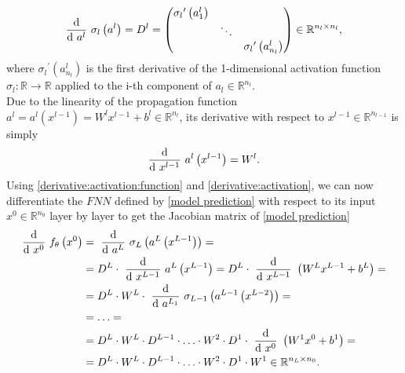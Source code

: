 \begin{equation}
    \label{derivative:activation:function}
    \frac{\textup{d}}{\textup{d} \ a^{l}} \ \sigma_{l} \left(a^l\right) = D^{l} = \begin{pmatrix} {\sigma_{l}}^{\prime} \left( a^{l}_1 \right) & & \\ & \ddots & \\ & & {\sigma_{l}}^{\prime} \left( a^{l}_{n_l} \right) \end{pmatrix} \in \mathbb{R}^{n_l \times n_l}, 
\end{equation}
where ${\sigma_{l}}^{\prime} \left( a^{l}_{n_l} \right)$ is the first derivative of the 1-dimensional activation function $\sigma_{l} \colon \mathbb{R} \to \mathbb{R}$ applied to the i-th component of $a_l \in \mathbb{R}^{n_l}$. \\
Due to the linearity of the propagation function $a^l = a^l\left(x^{l-1}\right) = W^{l} x^{l-1} + b^{l} \in \mathbb{R}^{n_l}$, its derivative with respect to $x^{l-1} \in \mathbb{R}^{n_{l-1}}$ is simply
\begin{equation}
    \label{derivative:activation}
    \frac{\textup{d}}{\textup{d} \ x^{l-1}} \ a^{l}\left(x^{l-1}\right) = W^l.
\end{equation}
Using \cref{derivative:activation:function} and \cref{derivative:activation}, we can now differentiate the $FNN$ defined by \cref{model prediction} with respect to its input $x^0 \in \mathbb{R}^{n_0}$ layer by layer to get the Jacobian matrix of \cref{model prediction}
\begin{equation} 
    \label{first order derivative}
    \begin{aligned}
        \frac{\textup{d}}{\textup{d} \ x^0} \  f_{\theta}\left(x^0\right) & =\ \frac{\textup{d}}{\textup{d} \ a^{L}} \ \sigma_{L} \left(a^{L}\left(x^{L-1}\right)\right) = \\
        & = D^L \cdot\ \frac{\textup{d}}{\textup{d} \ x^{L-1}} \ a^{L}\left(x^{L-1}\right) = D^L \cdot\ \frac{\textup{d}}{\textup{d} \ x^{L-1}} \ \left(W^{L} x^{L-1} + b^{L}\right) = \\
        & = D^L \cdot W^L \cdot\ \frac{\textup{d}}{\textup{d} \ a^{L_1}} \ \sigma_{L-1} \left(a^{L-1}\left(x^{L-2}\right)\right) = \\
        & = \ldots = \\
        & = D^L \cdot W^L \cdot D^{L-1} \cdot \ldots \cdot W^2 \cdot D^1 \cdot\ \frac{\textup{d}}{\textup{d} \ x^{0}} \ \left(W^{1} x^{0} + b^{1}\right) = \\
        & = D^L \cdot W^L \cdot D^{L-1} \cdot \ldots \cdot W^2 \cdot D^1 \cdot W^{1} \in \mathbb{R}^{n_L \times n_0}.
    \end{aligned} 
\end{equation} 


